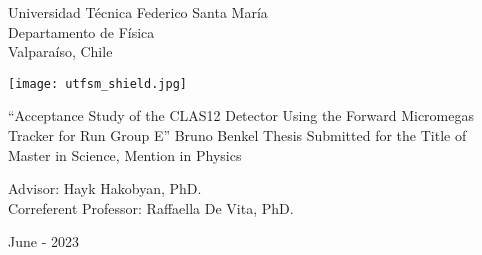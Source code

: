 \begin{titlepage}
\begin{center}
    \noindent
    \fontsize{18pt}{22pt}\selectfont Universidad T\'ecnica Federico Santa Mar\'ia \\
    \fontsize{16pt}{19pt}\selectfont Departamento de F\'isica \\
    \fontsize{16pt}{19pt}\selectfont Valpara\'iso, Chile \\
    \vspace{1.5cm}

    \texttt{[image: utfsm\_shield.jpg]}
    \vspace{1.5cm}

    \fontsize{20pt}{24pt}\selectfont ``Acceptance Study of the CLAS12 Detector Using the Forward Micromegas Tracker for Run Group E''
    \vfill
    \fontsize{16pt}{19pt}\selectfont Bruno Benkel
    \vfill
    \fontsize{16pt}{19pt}\selectfont Thesis Submitted for the Title of \\ Master in Science, Mention in Physics
    \vspace{1.5cm}

    \fontsize{14pt}{17pt}\selectfont Advisor: Hayk Hakobyan, PhD. \\
    \fontsize{14pt}{17pt}\selectfont Correferent Professor: Raffaella De Vita, PhD. %
    \vspace{2.5cm}

    \fontsize{14pt}{17pt}\selectfont June - 2023
\end{center}
\end{titlepage}

       \pagebreak
 \pagebreak
         \pagebreak
         \pagebreak
\tableofcontents                         \pagebreak
{} {}
\listoffigures                           \pagebreak

